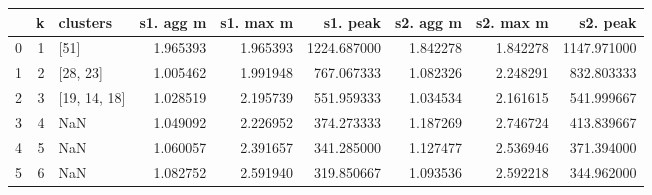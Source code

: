 \begin{tabular}{lrlrrrrrr}
\toprule
{} &  k &      clusters &  s1. agg m &  s1. max m &     s1. peak &  s2. agg m &  s2. max m &     s2. peak \\
\midrule
0 &  1 &          [51] &   1.965393 &   1.965393 &  1224.687000 &   1.842278 &   1.842278 &  1147.971000 \\
1 &  2 &      [28, 23] &   1.005462 &   1.991948 &   767.067333 &   1.082326 &   2.248291 &   832.803333 \\
2 &  3 &  [19, 14, 18] &   1.028519 &   2.195739 &   551.959333 &   1.034534 &   2.161615 &   541.999667 \\
3 &  4 &           NaN &   1.049092 &   2.226952 &   374.273333 &   1.187269 &   2.746724 &   413.839667 \\
4 &  5 &           NaN &   1.060057 &   2.391657 &   341.285000 &   1.127477 &   2.536946 &   371.394000 \\
5 &  6 &           NaN &   1.082752 &   2.591940 &   319.850667 &   1.093536 &   2.592218 &   344.962000 \\
\bottomrule
\end{tabular}
